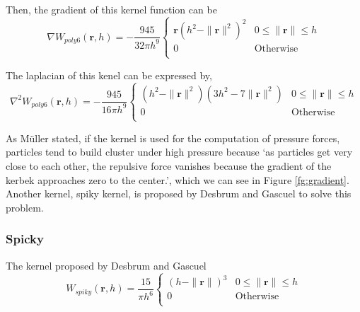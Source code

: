     Then, the gradient of this kernel function can be
    \begin{equation}
        \nabla W_{poly 6}(\textbf{r}, h) = - \frac{945}{32\pi h^9}
            \begin{cases}
                \textbf{r}(h^2 - \|\textbf{r}\|^2)^2 & 0\le\|\textbf{r}\|\le h \\
                0 & \textrm{Otherwise}\\
            \end{cases}
    \end{equation}

    The laplacian of this kenel can be expressed by, 
    \begin{equation}
        \nabla^2 W_{poly6}(\textbf{r}, h) = - \frac{945}{16\pi h^9}
            \begin{cases}
                (h^2 - \|\textbf{r}\|^2)(3h^2-7\|\textbf{r}\|^2) & 0\le\|\textbf{r}\|\le h \\
                0 & \textrm{Otherwise}\\
            \end{cases}
    \end{equation}

    As M\"uller stated\cite{muller2003particle}, if the kernel is used for the computation of pressure forces, particles tend to build cluster under high pressure because `as particles get very close to each other, the repulsive force vanishes because the gradient of the kerbek approaches zero to the center.', which we can see in Figure \ref{fg:gradient}. Another kernel, spiky kernel, is proposed by Desbrum and Gascuel\cite{desbrun1996smoothed} to solve this problem.

    \subsubsection{Spicky}

    The kernel proposed by Desbrum and Gascuel\cite{desbrun1996smoothed}
    \begin{equation}
        W_{spiky}(\textbf{r}, h) = \frac{15}{\pi h^6}
            \begin{cases}
                (h - \|\textbf{r}\|)^3 & 0\le\|\textbf{r}\|\le h \\
                0 & \textrm{Otherwise}\\
            \end{cases}
    \end{equation}

